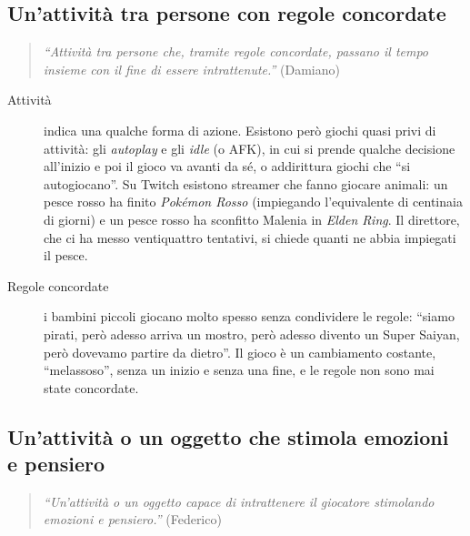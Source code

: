 \subsection{Un'attività tra persone con regole concordate}

\begin{quote}
\emph{``Attività tra persone che, tramite regole concordate, passano il tempo
insieme con il fine di essere intrattenute.''} (Damiano)
\end{quote}

\begin{description}
  \item[Attività] indica una qualche forma di azione. Esistono però giochi
        quasi privi di attività: gli \emph{autoplay} e gli \emph{idle} (o
        AFK), in cui si prende qualche decisione all'inizio e poi il gioco va
        avanti da sé, o addirittura giochi che ``si autogiocano''. Su Twitch
        esistono streamer che fanno giocare animali: un pesce rosso ha finito
        \emph{Pokémon Rosso} (impiegando l'equivalente di centinaia di giorni)
        e un pesce rosso ha sconfitto Malenia in \emph{Elden Ring}. Il
        direttore, che ci ha messo ventiquattro tentativi, si chiede quanti ne
        abbia impiegati il pesce.
  \item[Regole concordate] i bambini piccoli giocano molto spesso senza
        condividere le regole: ``siamo pirati, però adesso arriva un mostro,
        però adesso divento un Super Saiyan, però dovevamo partire da
        dietro''. Il gioco è un cambiamento costante, ``melassoso'', senza un
        inizio e senza una fine, e le regole non sono mai state concordate.
\end{description}

\subsection{Un'attività o un oggetto che stimola emozioni e pensiero}

\begin{quote}
\emph{``Un'attività o un oggetto capace di intrattenere il giocatore
stimolando emozioni e pensiero.''} (Federico)
\end{quote}

